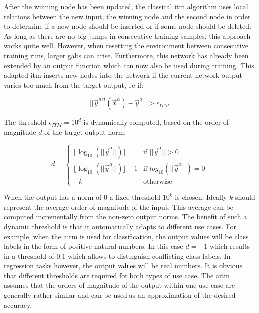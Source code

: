 After the winning node has been updated, the classical \gls{itm} algorithm uses local relations between the new input, the winning node and the second node in order to determine if a new node should be inserted or if some node should be deleted. As long as there are no big jumps in consecutive training samples, this approach works quite well. However, when resetting the environment between consecutive training runs, larger gabs can arise. Furthermore, this network has already been extended by an output function which can now also be used during training. This adapted \gls{itm} inserts new nodes into the network if the current network output varies too much from the target output, i.e if:

\begin{equation}
||\vec{y}^{net}(\vec{x}^\alpha)-\vec{y}^\alpha|| > \epsilon_{ITM}
\end{equation}

The threshold $\epsilon_{ITM} = 10^d$ is dynamically computed, based on the order of magnitude $d$ of the target output norm: %

\begin{equation}
d = \begin{cases}
\lfloor\log_{10}(||\vec{y}^\alpha||)\rfloor & \text{if $||\vec{y}^\alpha|| > 0$} \\
\lfloor\log_{10}(||\vec{y}^\alpha||)\rfloor-1 & \text{if $log_{10}(||\vec{y}^\alpha||) = 0$} \\
-k & \text{otherwise}
\end{cases}
\end{equation}


When the output has a norm of $0$ a fixed threshold $10^k$ is chosen. Ideally $k$ should represent the average order of magnitude of the input. This average can be computed incrementally from the non-zero output norms. The benefit of such a dynamic threshold is that it automatically adapts to different use cases. For example, when the \gls{aitm} is used for classification, the output values will be class labels in the form of positive natural numbers. In this case $d=-1$ which results in a threshold of 0.1 which allows to distinguish conflicting class labels.
In regression tasks however, the output values will be real numbers. It is obvious that different thresholds are required for both types of use case. The \gls{aitm} assumes that the orders of magnitude of the output within one use case are generally rather similar and can be used as an approximation of the desired accuracy.

